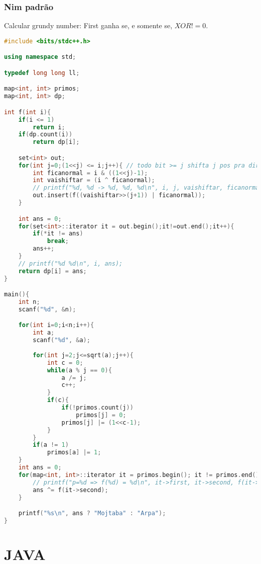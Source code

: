 \documentclass[12pt,a4paper,twoside]{report}
\begin{document}
\subsection{Nim padrão}

Calcular grundy number: First ganha se, e somente se, $XOR != 0$.

\noindent\begin{lstlisting}[caption=Nim Padrão,language=C++]
#include <bits/stdc++.h>

using namespace std;

typedef long long ll;

map<int, int> primos;
map<int, int> dp;

int f(int i){
    if(i <= 1)
        return i;
    if(dp.count(i))
        return dp[i];

    set<int> out;
    for(int j=0;(1<<j) <= i;j++){ // todo bit >= j shifta j pos pra direita, o resto fica igual
        int ficanormal = i & ((1<<j)-1);
        int vaishiftar = (i ^ ficanormal);
        // printf("%d, %d -> %d, %d, %d\n", i, j, vaishiftar, ficanormal, (vaishiftar>>(j+1))|ficanormal);
        out.insert(f((vaishiftar>>(j+1)) | ficanormal));
    }

    int ans = 0;
    for(set<int>::iterator it = out.begin();it!=out.end();it++){
        if(*it != ans)
            break;
        ans++;
    }
    // printf("%d %d\n", i, ans);
    return dp[i] = ans;
}

main(){
    int n;
    scanf("%d", &n);

    for(int i=0;i<n;i++){
        int a;
        scanf("%d", &a);
        
        for(int j=2;j<=sqrt(a);j++){
            int c = 0;
            while(a % j == 0){
                a /= j;
                c++;
            }
            if(c){
                if(!primos.count(j))
                    primos[j] = 0;
                primos[j] |= (1<<c-1);
            }
        }
        if(a != 1)
            primos[a] |= 1;
    }
    int ans = 0;
    for(map<int, int>::iterator it = primos.begin(); it != primos.end();it++){
        // printf("p=%d => f(%d) = %d\n", it->first, it->second, f(it->second));
        ans ^= f(it->second);
    }

    printf("%s\n", ans ? "Mojtaba" : "Arpa");
}
\end{lstlisting}

\chapter{JAVA}
\end{document}
